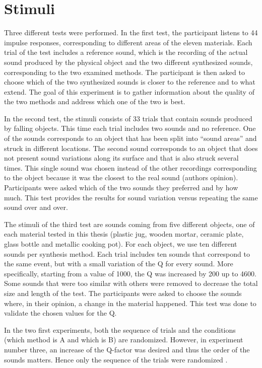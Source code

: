 \section{Stimuli}
Three different tests were performed. In the first test, the participant listens to 44 impulse responses, corresponding to different areas of the eleven materials. Each trial of the test includes a reference sound, which is the recording of the actual sound produced by the physical object and the two different synthesized sounds, corresponding to the two examined methods. The participant is then asked to choose which of the two synthesized sounds is closer to the reference and to what extend. The goal of this experiment is to gather information about the quality of the two methods and address which one of the two is best.

In the second test, the stimuli consists of 33 trials that contain sounds produced by falling objects. This time each trial includes two sounds and no reference. One of the sounds corresponds to an object that has been split into ``sound areas'' and struck in different locations. The second sound corresponds to an object that does not present sound variations along its surface and that is also struck several times. This single sound was chosen instead of the other recordings corresponding to the object because it was the closest to the real sound (authors opinion). Participants were asked which of the two sounds they preferred and by how much. This test provides the results for sound variation versus repeating the same sound over and over.

The stimuli of the third test are sounds coming from five different objects, one of each material tested in this thesis (plastic jug, wooden mortar, ceramic plate, glass bottle and metallic cooking pot). For each object, we use ten different sounds per synthesis method. Each trial includes ten sounds that correspond to the same event, but with a small variation of the \gls{Q} for every sound. More specifically, starting from a value of 1000, the \gls{Q} was increased by 200 up to 4600. Some sounds that were too similar with others were removed to decrease the total size and length of the test. The participants were asked to choose the sounds where, in their opinion, a change in the material happened. This test was done to validate the chosen values for the \gls{Q}.

In the two first experiments, both the sequence of trials and the conditions (which method is A and which is B) are randomized. However, in experiment number three, an increase of the Q-factor was desired and thus the order of the sounds matters. Hence only the sequence of the trials were randomized .

